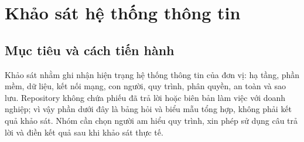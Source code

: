 \chapter{Khảo sát hệ thống thông tin}
\section{Mục tiêu và cách tiến hành}
Khảo sát nhằm ghi nhận hiện trạng hệ thống thông tin của đơn vị: hạ tầng, phần mềm, dữ liệu, kết nối mạng, con người, quy trình, phân quyền, an toàn và sao lưu. Repository không chứa phiếu đã trả lời hoặc biên bản làm việc với doanh nghiệp; vì vậy phần dưới đây là bảng hỏi và biểu mẫu tổng hợp, không phải kết quả khảo sát. Nhóm cần chọn người am hiểu quy trình, xin phép sử dụng câu trả lời và điền kết quả sau khi khảo sát thực tế.


